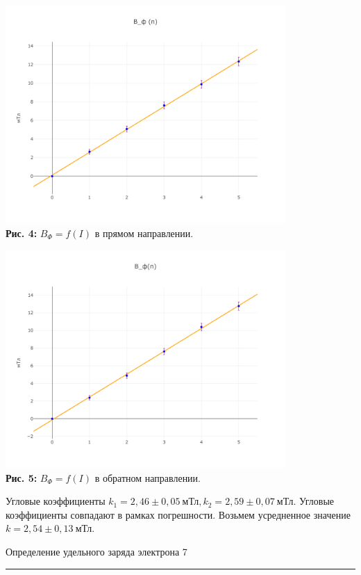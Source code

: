 \documentclass[12pt,a4paper]{scrartcl}
\begin{document}
\begin{center}
\includegraphics[width = 0.8\textwidth]{PIC_4.png}\\
\textbf{Рис. 4: } $B_{\Phi} = f(I)$ в прямом направлении.
\end{center}
\begin{center}
\includegraphics[width = 0.8\textwidth]{PIC_5.png}\\
\textbf{Рис. 5: } $B_{\Phi} = f(I)$ в обратном направлении.
\end{center}
Угловые коэффициенты $k_1 = 2,46 \pm 0,05 \ \text{мТл}, k_2 = 2,59 \pm 0,07 \ \text{мТл}.$ Угловые коэффициенты совпадают в рамках погрешности. Возьмем усредненное значение $k = 2,54 \pm 0,13 \ \text{мТл}$.

 	\newpage
	
	\begin{flushleft}
		\footnotesize{Определение удельного заряда электрона} \hspace{\fill} \footnotesize{7}
		\\[-0.3cm]\noindent\rule{\textwidth}{0.3pt}
	\end{flushleft} 
\end{document}
